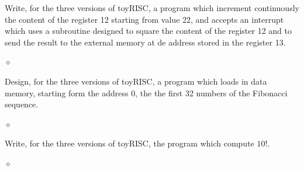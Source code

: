 \begin{problem}
Write, for the three versions of toyRISC, a program which increment continuously the content of the register 12 starting from value 22, and accepts an interrupt which uses a subroutine designed to  square the content of the register 12 and to send the result to the external memory at de address stored in the register 13.

$\diamond$
\end{problem}


\begin{problem}
Design, for the three versions of toyRISC,  a program which loads in data memory, starting form the address 0, the the first 32 numbers of the Fibonacci sequence.

$\diamond$
\end{problem}

\begin{problem}
Write, for the three versions of toyRISC,  the program which compute $10!$.

$\diamond$
\end{problem}



